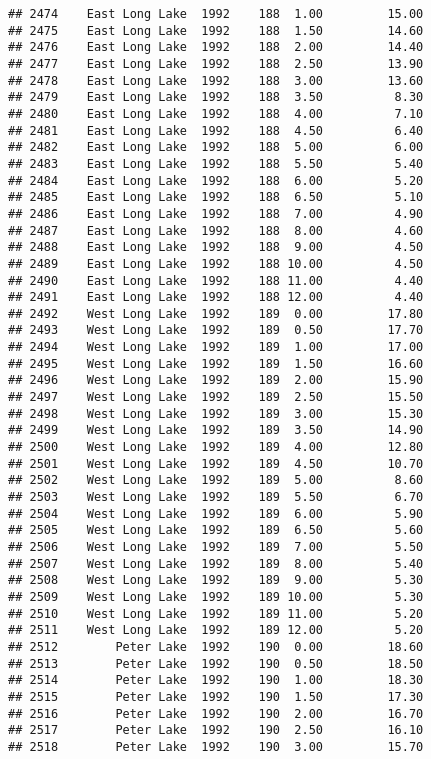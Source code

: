 \documentclass[
]{article}
\begin{document}
\begin{verbatim}
## 2474    East Long Lake  1992    188  1.00         15.00
## 2475    East Long Lake  1992    188  1.50         14.60
## 2476    East Long Lake  1992    188  2.00         14.40
## 2477    East Long Lake  1992    188  2.50         13.90
## 2478    East Long Lake  1992    188  3.00         13.60
## 2479    East Long Lake  1992    188  3.50          8.30
## 2480    East Long Lake  1992    188  4.00          7.10
## 2481    East Long Lake  1992    188  4.50          6.40
## 2482    East Long Lake  1992    188  5.00          6.00
## 2483    East Long Lake  1992    188  5.50          5.40
## 2484    East Long Lake  1992    188  6.00          5.20
## 2485    East Long Lake  1992    188  6.50          5.10
## 2486    East Long Lake  1992    188  7.00          4.90
## 2487    East Long Lake  1992    188  8.00          4.60
## 2488    East Long Lake  1992    188  9.00          4.50
## 2489    East Long Lake  1992    188 10.00          4.50
## 2490    East Long Lake  1992    188 11.00          4.40
## 2491    East Long Lake  1992    188 12.00          4.40
## 2492    West Long Lake  1992    189  0.00         17.80
## 2493    West Long Lake  1992    189  0.50         17.70
## 2494    West Long Lake  1992    189  1.00         17.00
## 2495    West Long Lake  1992    189  1.50         16.60
## 2496    West Long Lake  1992    189  2.00         15.90
## 2497    West Long Lake  1992    189  2.50         15.50
## 2498    West Long Lake  1992    189  3.00         15.30
## 2499    West Long Lake  1992    189  3.50         14.90
## 2500    West Long Lake  1992    189  4.00         12.80
## 2501    West Long Lake  1992    189  4.50         10.70
## 2502    West Long Lake  1992    189  5.00          8.60
## 2503    West Long Lake  1992    189  5.50          6.70
## 2504    West Long Lake  1992    189  6.00          5.90
## 2505    West Long Lake  1992    189  6.50          5.60
## 2506    West Long Lake  1992    189  7.00          5.50
## 2507    West Long Lake  1992    189  8.00          5.40
## 2508    West Long Lake  1992    189  9.00          5.30
## 2509    West Long Lake  1992    189 10.00          5.30
## 2510    West Long Lake  1992    189 11.00          5.20
## 2511    West Long Lake  1992    189 12.00          5.20
## 2512        Peter Lake  1992    190  0.00         18.60
## 2513        Peter Lake  1992    190  0.50         18.50
## 2514        Peter Lake  1992    190  1.00         18.30
## 2515        Peter Lake  1992    190  1.50         17.30
## 2516        Peter Lake  1992    190  2.00         16.70
## 2517        Peter Lake  1992    190  2.50         16.10
## 2518        Peter Lake  1992    190  3.00         15.70

\end{verbatim}
\end{document}
